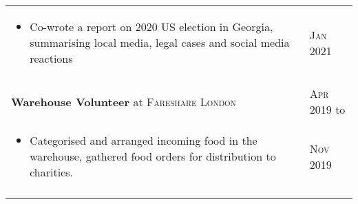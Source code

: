 \documentclass[a4paper,10pt]{article}
\newcommand{\datelen}{1.8cm}
\newcommand{\descrlen}{15.5cm}
\begin{document}
\begin{tabular}{p{\descrlen}|p{\datelen}}
{\begin{itemize}
  \item Co-wrote a report on 2020 US election in Georgia, summarising local media, legal cases and social media reactions
  \vspace{-0.5cm}
  \end{itemize}}&\textsc{Jan 2021}\\\multicolumn{2}{c}{} \\[-0.2cm]
  \textbf{Warehouse Volunteer} at \textsc{Fareshare London} & \textsc{Apr 2019} to\\
  \small{
  \vspace{-0.4cm}
  \begin{itemize}
  \item Categorised and arranged incoming food in the warehouse, gathered food orders for distribution to charities.
  \vspace{-0.5cm}
  \end{itemize}}&\textsc{Nov 2019}\\\multicolumn{2}{c}{} \\[-0.2cm]
\end{tabular}
\end{document}
